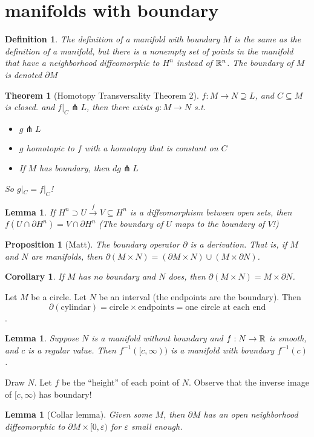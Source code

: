 \documentclass[11pt]{amsbook}
\theoremstyle{mystyle} \newtheorem{thrm}[thm]{Theorem}
\theoremstyle{mystyle} \newtheorem{defi}[thm]{Definition}
\theoremstyle{mystyle} \newtheorem{coro}[thm]{Corollary}
\theoremstyle{mystyle} \newtheorem{propo}[thm]{Proposition}
\theoremstyle{mystyle} \newtheorem{lemm}[thm]{Lemma}
\numberwithin{thm}{section}
\renewcommand{\epsilon}{\varepsilon}
\renewcommand{\d}{\partial}
\newcommand{\oo}{\infty}
\newcommand{\transverse}{\pitchfork}
\newcommand{\x}{\times}
\newcommand{\de}{\emph}
\begin{document}
\section{manifolds with boundary}
\begin{defi}
	The definition of a \de{manifold with boundary} $M$ is the same as the definition of a manifold, but there is a nonempty set of points in the manifold that have a neighborhood diffeomorphic to $H^n$ instead of ${\mathbb R}^n$.  The boundary of $M$ is denoted $\d M$
\end{defi}

\begin{thrm}[Homotopy Transversality Theorem 2]
	$f: M \to N \supseteq L$, and $C \subseteq M$ is closed.
	and $f|_C \transverse L$, then there exists
	$g: M \to N$ s.t.
	\begin{itemize}
		\item $g \transverse L$
		\item $g$ homotopic to $f$ with a homotopy that is constant on $C$
		\item If $M$ has boundary, then $dg \transverse L$
	\end{itemize}
	So $g|_C = f|_C$!
\end{thrm}
\begin{lemm}
	If $H^n \supset U \overset{f}{\to} V \subseteq H^n$ is a diffeomorphism between open sets, then $f( U \cap \d H^n ) = V \cap \d H^n$
	(The boundary of $U$ maps to the boundary of $V$!)
\end{lemm}
\begin{propo}[Matt]
	The boundary operator $\d$ is a derivation.  That is, if $M$ and $N$ are manifolds, then $\d(M \x N) = (\d M \x N) \cup (M \x \d N)$.
\end{propo}
\begin{coro}
	If $M$ has no boundary and $N$ does, then $\d(M \x N) = M \x \d N$.
\end{coro}
\begin{example}
	Let $M$ be a circle.  Let $N$ be an interval (the endpoints are the boundary).  Then $$\d(\text{cylindar}) = \text{circle} \x \text{endpoints} = \text{one circle at each end}$$.
\end{example}
\begin{lemm}
	Suppose $N$ is a manifold without boundary and $f : N \to {\mathbb R}$ is smooth, and $c$ is a regular value.  Then $f^{-1}([c,\oo))$ is a manifold with boundary $f^{-1}(c)$.
\end{lemm}
\begin{example}
	Draw $N$.  Let $f$ be the ``height'' of each point of $N$.  Observe that the inverse image of $[c, \oo)$ has boundary!
\end{example}
\begin{lemm}[Collar lemma]
	Given some $M$, then $\d M$ has an open neighborhood diffeomorphic to $\d M \x [0, \epsilon)$ for $\epsilon$ small enough.
\end{lemm}
\end{document}
